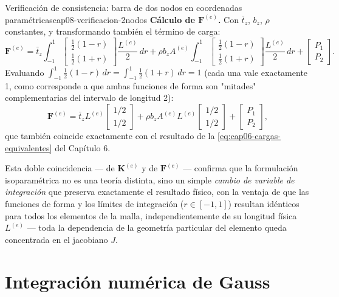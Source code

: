 \begin{ejemplo}{Verificación de consistencia: barra de dos nodos en coordenadas paramétricas}{cap08-verificacion-2nodos}
\textbf{Cálculo de $\bm F^{(e)}$.} Con $\bar t_z$, $b_z$, $\rho$ constantes, y transformando también el término de carga:
\[
\bm F^{(e)} = \bar t_z\int_{-1}^{1}\begin{bmatrix}\tfrac12(1-r)\\ \tfrac12(1+r)\end{bmatrix}\frac{L^{(e)}}{2}\,dr + \rho b_z A^{(e)}\int_{-1}^{1}\begin{bmatrix}\tfrac12(1-r)\\ \tfrac12(1+r)\end{bmatrix}\frac{L^{(e)}}{2}\,dr + \begin{bmatrix}P_1\\P_2\end{bmatrix} .
\]
Evaluando $\int_{-1}^1 \tfrac12(1-r)\,dr = \int_{-1}^1 \tfrac12(1+r)\,dr = 1$ (cada una vale exactamente 1, como corresponde a que ambas funciones de forma son "mitades" complementarias del intervalo de longitud 2):
\[
\bm F^{(e)} = \bar t_z L^{(e)}\begin{bmatrix}1/2\\1/2\end{bmatrix} + \rho b_z A^{(e)}L^{(e)}\begin{bmatrix}1/2\\1/2\end{bmatrix} + \begin{bmatrix}P_1\\P_2\end{bmatrix} ,
\]
que también coincide exactamente con el resultado de la \cref{eq:cap06-cargas-equivalentes} del Capítulo 6.

Esta doble coincidencia --- de $\bm K^{(e)}$ y de $\bm F^{(e)}$ --- confirma que la formulación isoparamétrica no es una teoría distinta, sino un simple \emph{cambio de variable de integración} que preserva exactamente el resultado físico, con la ventaja de que las funciones de forma y los límites de integración ($r\in[-1,1]$) resultan idénticos para todos los elementos de la malla, independientemente de su longitud física $L^{(e)}$ --- toda la dependencia de la geometría particular del elemento queda concentrada en el jacobiano $J$.
\end{ejemplo}

\section{Integración numérica de Gauss}

